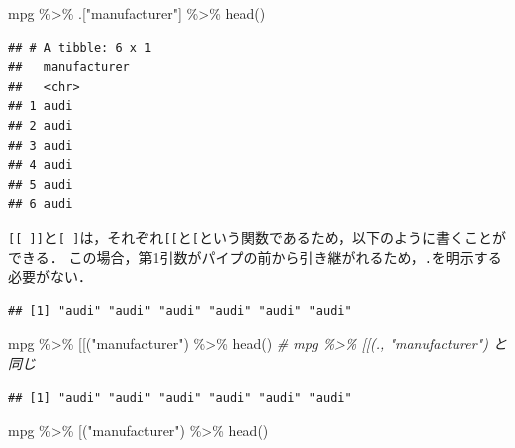 \documentclass[
]{article}
\newenvironment{Shaded}{\begin{snugshade}}{\end{snugshade}}
\newcommand{\AttributeTok}[1]{\textcolor[rgb]{0.77,0.63,0.00}{#1}}
\newcommand{\CommentTok}[1]{\textcolor[rgb]{0.56,0.35,0.01}{\textit{#1}}}
\newcommand{\FunctionTok}[1]{\textcolor[rgb]{0.00,0.00,0.00}{#1}}
\newcommand{\NormalTok}[1]{#1}
\newcommand{\SpecialCharTok}[1]{\textcolor[rgb]{0.00,0.00,0.00}{#1}}
\newcommand{\StringTok}[1]{\textcolor[rgb]{0.31,0.60,0.02}{#1}}
\begin{document}
\begin{Shaded}
\begin{Highlighting}[]
\NormalTok{mpg }\SpecialCharTok{\%\textgreater{}\%}\NormalTok{ .[}\StringTok{"manufacturer"}\NormalTok{]   }\SpecialCharTok{\%\textgreater{}\%} \FunctionTok{head}\NormalTok{()}
\end{Highlighting}
\end{Shaded}

\begin{verbatim}
## # A tibble: 6 x 1
##   manufacturer
##   <chr>       
## 1 audi        
## 2 audi        
## 3 audi        
## 4 audi        
## 5 audi        
## 6 audi
\end{verbatim}

\texttt{{[}{[}\ {]}{]}}と\texttt{{[}\ {]}}は，それぞれ\texttt{{[}{[}}と\texttt{{[}}という関数であるため，以下のように書くことができる．
この場合，第1引数がパイプの前から引き継がれるため，\texttt{.}を明示する必要がない．

\begin{Shaded}
\end{Shaded}

\begin{verbatim}
## [1] "audi" "audi" "audi" "audi" "audi" "audi"
\end{verbatim}

\begin{Shaded}
\begin{Highlighting}[]
\NormalTok{mpg }\SpecialCharTok{\%\textgreater{}\%} \StringTok{\textasciigrave{}}\AttributeTok{[[}\StringTok{\textasciigrave{}}\NormalTok{(}\StringTok{"manufacturer"}\NormalTok{) }\SpecialCharTok{\%\textgreater{}\%} \FunctionTok{head}\NormalTok{() }\CommentTok{\# mpg \%\textgreater{}\% \textasciigrave{}[[\textasciigrave{}(., "manufacturer") と同じ}
\end{Highlighting}
\end{Shaded}

\begin{verbatim}
## [1] "audi" "audi" "audi" "audi" "audi" "audi"
\end{verbatim}

\begin{Shaded}
\begin{Highlighting}[]
\NormalTok{mpg }\SpecialCharTok{\%\textgreater{}\%} \StringTok{\textasciigrave{}}\AttributeTok{[}\StringTok{\textasciigrave{}}\NormalTok{(}\StringTok{"manufacturer"}\NormalTok{)  }\SpecialCharTok{\%\textgreater{}\%} \FunctionTok{head}\NormalTok{()}
\end{Highlighting}
\end{Shaded}
\end{document}

